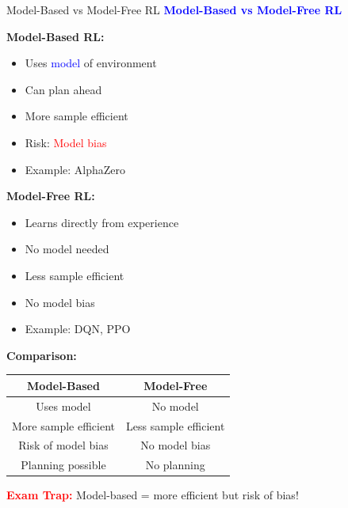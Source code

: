 \documentclass[8pt]{beamer}
\begin{document}
	\begin{frame}{Model-Based vs Model-Free RL}
		\fontsize{6.5}{7.5}\selectfont
		\textcolor{blue}{\textbf{Model-Based vs Model-Free RL}}
		
		\textbf{Model-Based RL:}
		\begin{itemize}
			\item Uses \textcolor{blue}{model} of environment
			\item Can plan ahead
			\item More sample efficient
			\item Risk: \textcolor{red}{Model bias}
			\item Example: AlphaZero
		\end{itemize}
		
		\textbf{Model-Free RL:}
		\begin{itemize}
			\item Learns directly from experience
			\item No model needed
			\item Less sample efficient
			\item No model bias
			\item Example: DQN, PPO
		\end{itemize}
		
		\textbf{Comparison:}
		\begin{tabular}{|c|c|}
			\hline
			Model-Based & Model-Free \\
			\hline
			Uses model & No model \\
			\hline
			More sample efficient & Less sample efficient \\
			\hline
			Risk of model bias & No model bias \\
			\hline
			Planning possible & No planning \\
			\hline
		\end{tabular}
		
		\textcolor{red}{\textbf{Exam Trap:}} Model-based = more efficient but risk of bias!
	\end{frame}
	
\end{document}

